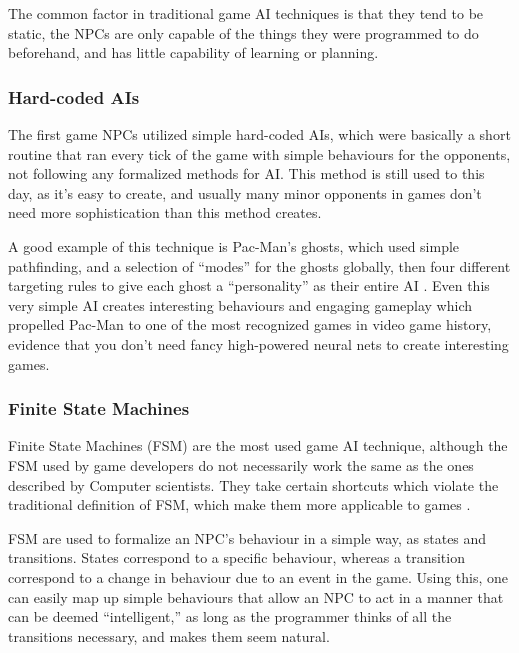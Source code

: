 \documentclass[]{report}
\begin{document}
The common factor in traditional game AI techniques is that they tend to be
static, the NPCs are only capable of the things they were programmed to do
beforehand, and has little capability of learning or planning.


\subsubsection{Hard-coded AIs}
\label{sec:hard-coded-ais}

The first game NPCs utilized simple hard-coded AIs, which were basically a short
routine that ran every tick of the game with simple behaviours for the
opponents, not following any formalized methods for AI. This method is still
used to this day, as it's easy to create, and usually many minor opponents in
games don't need more sophistication than this method creates.

A good example of this technique is Pac-Man's ghosts, which used simple
pathfinding, and a selection of ``modes'' for the ghosts globally, then four
different targeting rules to give each ghost a ``personality'' as their entire
AI \citep{birch2010pacman,pittmanpac}. Even this very simple AI creates
interesting behaviours and engaging gameplay which propelled Pac-Man to one of
the most recognized games in video game history, evidence that you don't need
fancy high-powered neural nets to create interesting games.

\subsubsection{Finite State Machines}
\label{sec:finite-state-mach}

Finite State Machines (FSM) are the most used game AI technique, although the
FSM used by game developers do not necessarily work the same as the ones
described by Computer scientists. They take certain shortcuts which violate the
traditional definition of FSM, which make them more applicable to games
\citep{rabin2002implementing}.

FSM are used to formalize an NPC's behaviour in a simple way, as states and
transitions. States correspond to a specific behaviour, whereas a transition
correspond to a change in behaviour due to an event in the game. Using this, one
can easily map up simple behaviours that allow an NPC to act in a manner that
can be deemed ``intelligent,'' as long as the programmer thinks of all the
transitions necessary, and makes them seem natural.
\end{document}
